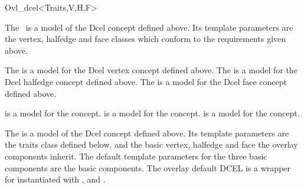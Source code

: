 
\ccRefPageBegin


\begin{ccRefClass}{Ovl_dcel<Traits,V,H,F>}

\ccDefinition

    The \ccClassTemplateName\ is a model of the Dcel concept
    defined above. Its template parameters are the vertex, halfedge and face
    classes which conform to the requirements given above.


\ccIsModel

The  is a model for the 
Dcel vertex concept defined above. 
The  is a
model for the Dcel halfedge concept defined above.
The  is a
model for the Dcel face concept defined above. 

 is a model for the  concept.
 is a model for the  concept.
 is a model for the  concept.



The  
is a model of the Dcel concept
defined above. Its template parameters are the traits class defined below, 
and the basic vertex, halfedge and face the overlay components inherit.
The default template parameters for the three basic components are the 
 basic components.
The overlay default DCEL is a wrapper for  instantiated 
with ,
 and 
.


\end{ccRefClass}
\ccRefPageEnd
